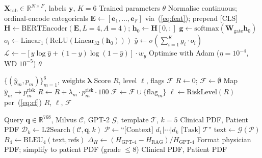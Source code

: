 \documentclass[AMA,STIX1COL,]{WileyNJD-v2}
\begin{document}
\begin{algorithm}[!t]
\caption{TabularBERT-MoE Training and Inference}
\label{alg:tab}
\begin{algorithmic}[1]
\Require $\mathbf{X}_{\mathrm{tab}}\!\in\!\mathbb{R}^{N\times F}$,
         labels $\mathbf{y}$, $K\!=\!6$
\Ensure Trained parameters $\theta$
\State Normalise continuous; ordinal-encode categoricals
\State $\mathbf{E}\leftarrow[\mathbf{e}_1,\ldots,\mathbf{e}_F]$
       via~(\ref{eq:feat}); prepend [CLS]
\State $\mathbf{H}\leftarrow\mathrm{BERTEncoder}(\mathbf{E},L\!=\!4,A\!=\!4)$;
       $\mathbf{h}_0\leftarrow\mathbf{H}[0,:]$
\State $\mathbf{g}\leftarrow\mathrm{softmax}(\mathbf{W}_{\mathrm{gate}}\mathbf{h}_0)$
  \State $o_i\leftarrow\mathrm{Linear}_1(\mathrm{ReLU}(\mathrm{Linear}_{32}(\mathbf{h}_0)))$
\EndFor
\State $\hat{y}\leftarrow\sigma(\sum_{i=1}^K g_i\cdot o_i)$
\State $\mathcal{L}\leftarrow-[y\log\hat{y}+(1-y)\log(1-\hat{y})]\cdot w_y$
\State Optimise with Adam ($\eta\!=\!10^{-4}$, WD $10^{-5}$)
\State \Return $\theta$
\end{algorithmic}
\end{algorithm}

\begin{algorithm}[!t]
\caption{CardioFusion Unified Risk Scorer}
\label{alg:cf}
\begin{algorithmic}[1]
\Require $\{(\hat{y}_m,p_m)\}_{m=1}^6$, weights $\boldsymbol{\lambda}$
\Ensure Score $R$, level $\ell$, flags $\mathcal{F}$
\State $R\leftarrow 0$; $\mathcal{F}\leftarrow\emptyset$
  \State Map $\hat{y}_m\rightarrow p^{\mathrm{risk}}_m$
  \State $R\leftarrow R+\lambda_m\cdot p^{\mathrm{risk}}_m\cdot 100$
    \State $\mathcal{F}\leftarrow\mathcal{F}\cup\{\mathrm{flag}_m\}$
  \EndIf
\EndFor
\State $\ell\leftarrow\mathrm{RiskLevel}(R)$ per~(\ref{eq:cf})
\State \Return $R$, $\ell$, $\mathcal{F}$
\end{algorithmic}
\end{algorithm}

\begin{algorithm}[!t]
\caption{RAG-Augmented Clinical Report Generation}
\label{alg:rag}
\begin{algorithmic}[1]
\Require Query $\mathbf{q}\!\in\!\mathbb{R}^{768}$, Milvus $\mathcal{C}$,
         GPT-2 $\mathcal{G}$, template $\mathcal{T}$, $k\!=\!5$
\Ensure Clinical PDF, Patient PDF
\State $\mathcal{D}_k\leftarrow\mathrm{L2Search}(\mathcal{C},\mathbf{q},k)$
\State $\mathcal{P}\leftarrow\text{``[Context] }d_1|\cdots|d_k
       \text{ [Task] }\mathcal{T}\text{''}$
\State $\mathrm{text}\leftarrow\mathcal{G}(\mathcal{P})$
\State $B_4\leftarrow\mathrm{BLEU}_4(\mathrm{text},\mathrm{refs})$
\State $\Delta_H\leftarrow(H_{\mathrm{GPT\text{-}4}}-H_{\mathrm{RAG}})/
       H_{\mathrm{GPT\text{-}4}}$
\State Format physician PDF; simplify to patient PDF (grade $\leq8$)
\State \Return Clinical PDF, Patient PDF
\end{algorithmic}
\end{algorithm}
\end{document}
